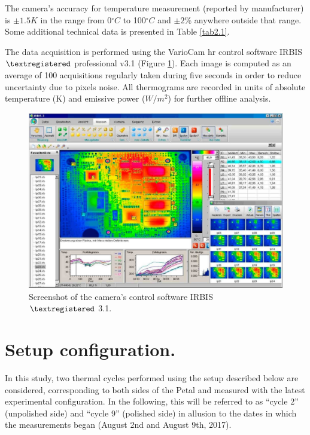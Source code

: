 		The camera’s accuracy for temperature measurement (reported by manufacturer) is $\pm 1.5 K$ in the range from 0\space$^\circ C$ to 100\space$^\circ C$ and $\pm2$\% anywhere outside that range. Some additional technical data is presented in Table \ref{tab2.1}.
		
		The data acquisition is performed using the VarioCam hr control software IRBIS $\textregistered$ professional v3.1 (Figure \ref{fig2.6}). Each image is computed as an average of 100 acquisitions regularly taken during five seconds in order to reduce uncertainty due to pixels noise. All thermograms are recorded in units of absolute temperature (K) and emissive power ($W/m^2$) for further offline analysis.
		
		\begin{figure}[ht!]
			\centering
			\captionsetup{justification=centering,margin=2cm}
			\includegraphics[scale=0.25]{Figures/Chapter02/IRBISimage.jpg}
			\caption{Screenshot of the camera’s control software IRBIS $\textregistered$ 3.1.}\label{fig2.6}
		\end{figure}\bigskip
		
	\section{Setup configuration.}\label{section2.4}
	
		In this study, two thermal cycles performed using the setup described below are considered, corresponding to both sides of the Petal and measured with the latest experimental configuration. In the following, this will be referred to as “cycle 2” (unpolished side) and “cycle 9” (polished side) in allusion to the dates in which the measurements began (August 2nd and August 9th, 2017). 
		
